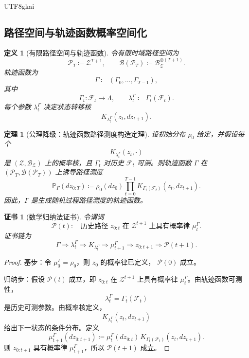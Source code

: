 \documentclass[12pt]{article}
\newtheorem{definition}{定义}[section]
\newtheorem{theorem}{定理}[section]
\newtheorem{Certificate}{证书}[section]
\newcommand{\DefEq}{\coloneqq}
\newcommand{\Prob}{\mathbb P}
\newcommand{\Fil}{\mathcal F}
\begin{document}
\begin{CJK*}{UTF8}{gkai}
\subsection{路径空间与轨迹函数概率空间化}
\label{subsec:path-space-trajectory-probabilization}

\begin{definition}[有限路径空间与轨迹函数]
令有限时域路径空间为
\[
\mathcal P_T
\DefEq
\mathcal Z^{T+1},
\qquad
\mathscr B(\mathcal P_T)
\DefEq
\mathscr B_{\mathcal Z}^{\otimes(T+1)}.
\]
轨迹函数为
\[
\Gamma
\DefEq
(\Gamma_0,\ldots,\Gamma_{T-1}),
\]
其中
\[
\Gamma_t:\Fil_t\to\Lambda,
\qquad
\lambda_t^\Gamma
\DefEq
\Gamma_t(\Fil_t).
\]
每个参数 \(\lambda_t^\Gamma\) 决定状态转移核
\[
K_{\lambda_t^\Gamma}(z_t,dz_{t+1}).
\]
\end{definition}

\begin{theorem}[公理降级：轨迹函数路径测度构造定理]
设初始分布 \(\rho_0\) 给定，并假设每个
\[
K_{\lambda_t^\Gamma}(z_t,\cdot)
\]
是 \((\mathcal Z,\mathscr B_{\mathcal Z})\) 上的概率核，且
\(\Gamma_t\) 对历史 \(\Fil_t\) 可测。则轨迹函数 \(\Gamma\) 在
\((\mathcal P_T,\mathscr B(\mathcal P_T))\) 上诱导路径测度
\[
\boxed{
\Prob_\Gamma(dz_{0:T})
\DefEq
\rho_0(dz_0)
\prod_{t=0}^{T-1}
K_{\Gamma_t(\Fil_t)}(z_t,dz_{t+1}).
}
\]
因此，\(\Gamma\) 是生成随机过程路径测度的轨迹函数。
\end{theorem}

\begin{Certificate}[数学归纳法证书]
令谓词
\[
\mathcal P(t):
\quad
\text{历史路径 }z_{0:t}\text{ 在 }\mathcal Z^{t+1}\text{ 上具有概率律 }\mu_t^\Gamma.
\]
证书链为
\[
\boxed{
\Gamma
\Rightarrow
\lambda_t^\Gamma
\Rightarrow
K_{\lambda_t^\Gamma}
\Rightarrow
\mu_{t+1}^\Gamma
\Rightarrow
z_{0:t+1}
\Rightarrow
\mathcal P(t+1).
}
\]
\end{Certificate}

\begin{proof}
基步：令 \(\mu_0^\Gamma=\rho_0\)，则 \(z_0\) 的概率律已定义，
\(\mathcal P(0)\) 成立。

归纳步：假设 \(\mathcal P(t)\) 成立，即 \(z_{0:t}\) 在
\(\mathcal Z^{t+1}\) 上具有概率律 \(\mu_t^\Gamma\)。由轨迹函数可测性，
\[
\lambda_t^\Gamma=\Gamma_t(\Fil_t)
\]
是历史可测参数。由概率核定义，
\[
K_{\lambda_t^\Gamma}(z_t,dz_{t+1})
\]
给出下一状态的条件分布。定义
\[
\mu_{t+1}^\Gamma(dz_{0:t+1})
\DefEq
\mu_t^\Gamma(dz_{0:t})\,
K_{\Gamma_t(\Fil_t)}(z_t,dz_{t+1}).
\]
则 \(z_{0:t+1}\) 具有概率律 \(\mu_{t+1}^\Gamma\)，所以
\(\mathcal P(t+1)\) 成立。


\end{proof}
\end{CJK*}
\end{document}
